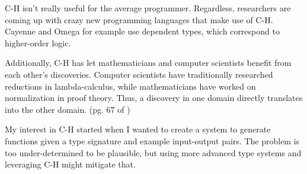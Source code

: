 C-H isn't really useful for the average programmer. Regardless, researchers are coming up with crazy new programming languages that make use of C-H. Cayenne and Omega for example use dependent types, which correspond to higher-order logic.

Additionally, C-H has let mathematicians and computer scientists benefit from each other's discoveries. Computer scientists have traditionally researched reductions in lambda-calculus, while mathematicians have worked on normalization in proof theory. Thus, a discovery in one domain directly translates into the other domain. (pg. 67 of \cite{CHnotes})

My interest in C-H started when I wanted to create a system to generate functions given a type signature and example input-output pairs. The problem is too under-determined to be plausible, but using more advanced type systems and leveraging C-H might mitigate that.
